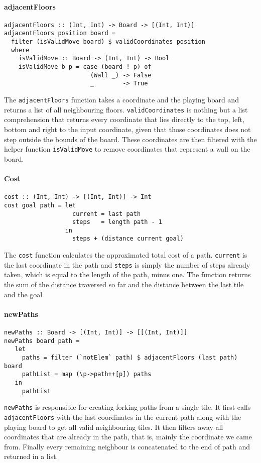 \documentclass{article}
\begin{document}
        \paragraph{adjacentFloors}
   \begin{verbatim}
adjacentFloors :: (Int, Int) -> Board -> [(Int, Int)]
adjacentFloors position board =
  filter (isValidMove board) $ validCoordinates position
  where
    isValidMove :: Board -> (Int, Int) -> Bool
    isValidMove b p = case (board ! p) of
                        (Wall _) -> False
                        _        -> True
   \end{verbatim}
The \texttt{adjacentFloors} function takes a coordinate and the playing board and returns a list of all neighbouring floors. \texttt{validCoordinates} is nothing but a list comprehension that returns every coordinate that lies directly to the top, left, bottom and right to the input coordinate, given that those coordinates does not step outside the bounds of the board. These coordinates are then filtered with the helper function \texttt{isValidMove} to remove coordinates that represent a wall on the board.
        \paragraph{Cost}
   \begin{verbatim}
cost :: (Int, Int) -> [(Int, Int)] -> Int
cost goal path = let
                   current = last path
                   steps   = length path - 1
                 in
                   steps + (distance current goal)
   \end{verbatim}
The \texttt{cost} function calculates the approximated total cost of a path. \texttt{current} is the last coordinate in the path and \texttt{steps} is simply the number of steps already taken, which is equal to the length of the path, minus one. The function returns the sum of the distance traversed so far and the distance between the last tile and the goal
\paragraph{newPaths}
\begin{verbatim}
newPaths :: Board -> [(Int, Int)] -> [[(Int, Int)]]
newPaths board path =
   let
     paths = filter (`notElem` path) $ adjacentFloors (last path) board
     pathList = map (\p->path++[p]) paths
   in
     pathList
\end{verbatim}
\texttt{newPaths} is responsible for creating forking paths from a single tile. It first calls \texttt{adjacentFloors} with the last coordinates in the current path along with the playing board to get all valid neighbouring tiles. It then filters away all coordinates that are already in the path, that is, mainly the coordinate we came from. Finally every remaining neighbour is concatenated to the end of path and returned in a list.
\end{document}

